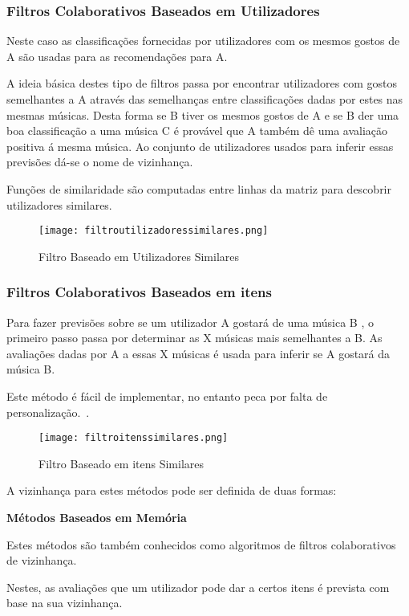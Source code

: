 \hfill
\subsubsection{ Filtros Colaborativos Baseados em Utilizadores}
\hfill
 \par Neste caso as classificações fornecidas por utilizadores com os mesmos gostos de A são usadas para as recomendações para A. 
 \par A ideia básica destes tipo de filtros passa por encontrar utilizadores com gostos semelhantes a A através das semelhanças entre classificações dadas por estes nas mesmas músicas. Desta forma se B tiver os mesmos gostos de A e se B der uma boa classificação a uma música C é provável que A também dê uma avaliação positiva á mesma música. Ao conjunto de utilizadores usados para inferir essas previsões dá-se o nome de vizinhança.
 \par Funções de similaridade são computadas entre linhas da matriz para descobrir utilizadores similares.\newline
\hfill
\begin{figure}[H]
  \centering
  \texttt{[image: filtroutilizadoressimilares.png]}
  \caption {Filtro Baseado em Utilizadores Similares}
  \label {fig01}
\end{figure}

\subsubsection{ Filtros Colaborativos Baseados em itens}
\hfill
 \par Para fazer previsões sobre se um utilizador A gostará de uma música B , o primeiro passo passa por determinar as X músicas mais semelhantes a B. As avaliações dadas por A a essas X músicas é usada para inferir se A gostará da música B.
 \par Este método é fácil de implementar, no entanto peca por falta de personalização.~\cite{ref_article1}.\newline
\begin{figure}[H]
  \centering
  \texttt{[image: filtroitenssimilares.png]}
  \caption{Filtro Baseado em itens Similares}
  \label{fig02}
\end{figure}


\par A vizinhança para estes métodos pode ser definida de duas formas:

\begin{center}
\normalsize{\bfseries Métodos Baseados em Memória}\hfill
\end{center}
 \par Estes métodos são também conhecidos como algoritmos de filtros colaborativos de vizinhança.
 \par Nestes, as avaliações que um utilizador pode dar a certos itens é prevista com base na sua vizinhança.\newline


